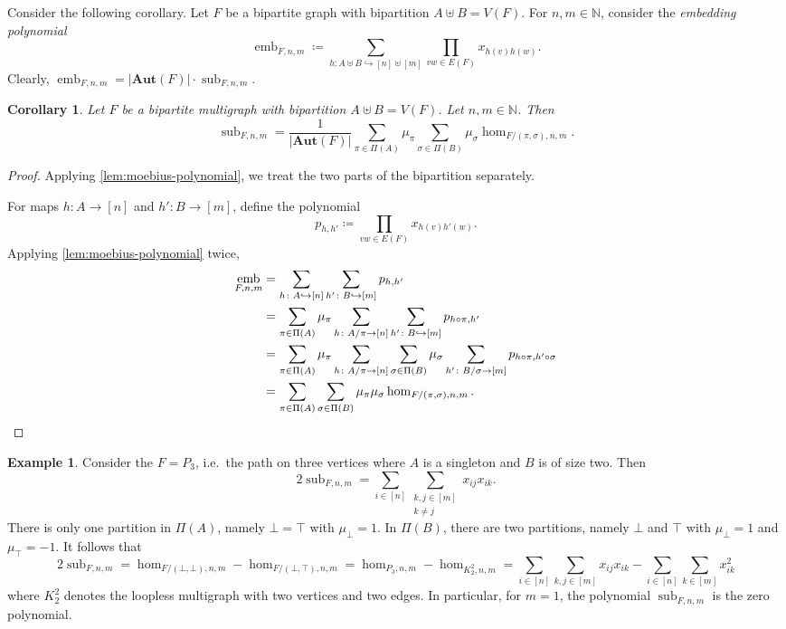 \documentclass[11pt, DIV=15]{scrarticle}
\theoremstyle{definition}
\newtheorem{example}[definition]{Example}
\theoremstyle{plain}
\newtheorem{corollary}[definition]{Corollary}
\theoremstyle{remark}
\DeclareMathOperator{\sub}{sub}
\DeclareMathOperator{\emb}{emb}
\newcommand{\Aut}{\mathbf{Aut}}
\begin{document}
	Consider the following corollary.
	Let $F$ be a bipartite graph with bipartition $A \uplus B = V(F)$.
	For $n, m\in \mathbb{N}$, consider the \emph{embedding polynomial}
	\[
	\emb_{F, n,m} \coloneqq \sum_{h \colon A \uplus B \hookrightarrow [n] \uplus [m]} \prod_{vw \in E(F)} x_{h(v)h(w)}.
	\]
	Clearly, $\emb_{F, n,m} = |\Aut(F)| \cdot \sub_{F, n,m}$.
	
	
	\begin{corollary} \label{thm:sub-hom}
		Let $F$ be a bipartite multigraph with bipartition $A \uplus B = V(F)$.
		Let $n,m \in \mathbb{N}$.
		Then
		\[
		\sub_{F, n,m} = \frac{1}{|\Aut(F)|} \sum_{\pi \in \Pi(A)} \mu_{\pi} \sum_{\sigma \in \Pi(B)} \mu_{\sigma} \hom_{F/(\pi, \sigma), n, m}.
		\]
	\end{corollary}
	
	\begin{proof}
		Applying \cref{lem:moebius-polynomial},
		we treat the two parts of the bipartition separately.
	
		For maps $h \colon A \to [n]$ and $h' \colon B \to [m]$, define the polynomial
		\[
			p_{h,h'} \coloneqq \prod_{vw \in E(F)} x_{h(v)h'(w)}.
		\]
		Applying \cref{lem:moebius-polynomial} twice,
		\begin{align*}
			\emb_{F, n, m} 
			&= \sum_{h \colon A \hookrightarrow [n]} \sum_{h' \colon B \hookrightarrow [m]} p_{h,h'} \\
			&= \sum_{\pi \in \Pi(A)} \mu_\pi \sum_{h \colon A/\pi \to [n]} \sum_{h' \colon B \hookrightarrow [m]} p_{h \circ \pi,h'} \\
			&= \sum_{\pi \in \Pi(A)} \mu_\pi \sum_{h \colon A/\pi \to [n]} \sum_{\sigma \in \Pi(B)} \mu_\sigma \sum_{h' \colon B/\sigma \to [m]} p_{h \circ \pi, h' \circ \sigma} \\
			&= \sum_{\pi \in \Pi(A)} \sum_{\sigma \in \Pi(B)} \mu_\pi \mu_\sigma \hom_{F/(\pi, \sigma), n,m}. \qedhere
		\end{align*}
	\end{proof}
	
	\begin{example}
		Consider the $F = P_3$, i.e.\ the path on three vertices where $A$ is a singleton and $B$ is of size two. Then
		\[
		2\sub_{F, n, m} = \sum_{i \in [n]} \sum_{\substack{k, j \in [m] \\ k \neq j}} x_{ij}x_{ik}.
		\]
		There is only one partition in $\Pi(A)$, namely $\bot = \top$ with $\mu_\bot = 1$.
		In $\Pi(B)$, there are two partitions, namely $\bot$ and $\top$ with $\mu_\bot = 1$ and $\mu_\top = -1$.
		It follows that
		\[
		2\sub_{F, n, m} =  \hom_{F/(\bot, \bot), n,m} - \hom_{F/(\bot, \top), n,m}
		= \hom_{P_3, n, m} - \hom_{K_2^2, n, m}
		=  \sum_{i \in [n]} \sum_{k, j \in [m]} x_{ij}x_{ik} - \sum_{i \in [n]} \sum_{k \in [m]} x_{ik}^2
		\]
		where $K_2^2$ denotes the loopless multigraph with two vertices and two edges.
		In particular, for $m = 1$, the polynomial $\sub_{F, n, m}$ is the zero polynomial.
	\end{example}
	
\end{document}
